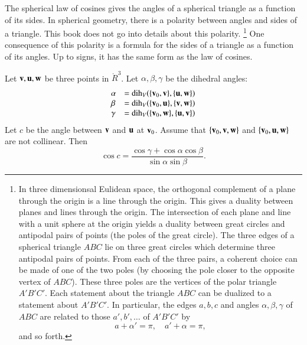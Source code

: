 The spherical law of cosines gives the angles of a spherical triangle
as a function of its sides.  In spherical geometry, there is a
polarity between angles and sides of a triangle.  This book does not
go into details about this polarity.%
\footnote{In three dimensionsal Eulidean space, the orthogonal
  complement of a plane through the origin is a line through the
  origin.  This gives a duality between planes and lines through the
  origin.  The intersection of each plane and line with a unit sphere
  at the origin yields a duality between great circles and antipodal
  pairs of points (the poles of the great circle).  The three edges of
  a spherical triangle $ABC$ lie on three great circles which
  determine three antipodal pairs of points.  From each of the three
  pairs, a coherent choice can be made of one of the two poles (by
  choosing the pole closer to the opposite vertex of $ABC$).  These
  three poles are the vertices of the polar triangle $A'B'C'$.  Each
  statement about the triangle $ABC$ can be dualized to a statement
  about $A'B'C'$.  In particular, the edges $a,b,c$ and angles
  $\alpha,\beta,\gamma$ of $ABC$ are related to those $a',b',\ldots$
  of $A'B'C'$ by
\begin{displaymath}
a + \alpha' = \pi,\quad a' + \alpha= \pi,
\end{displaymath}
and so forth.
}  %
One
consequence of this polarity is a formula for the sides of
a triangle as a function of its angles.  Up to signs,
it has the same form as the law of cosines.
%

\begin{lemma}
\label{lemma:sloc2}  Let
  ${\mathbf v},{\mathbf u},{\mathbf w}$ be three points in $\ring{R}^3$.  Let
  $\alpha,\beta,\gamma$ be the dihedral angles:
\begin{displaymath}
\begin{array}{lll}
\alpha &= \operatorname{dih}_V(\{{\mathbf v}_0,{\mathbf v}\},\{{\mathbf u},{\mathbf w}\})\\
\beta &= \operatorname{dih}_V(\{{\mathbf v}_0,{\mathbf u}\},\{{\mathbf v},{\mathbf w}\})\\
\gamma&= \operatorname{dih}_V(\{{\mathbf v}_0,{\mathbf w}\},\{{\mathbf u},{\mathbf v}\})\\
\end{array}
\end{displaymath}
Let $c$ be the
angle between ${\mathbf v}$ and ${\mathbf u}$ at ${\mathbf v}_0$. 
Assume that $\{{\mathbf v}_0,{\mathbf v},{\mathbf w}\}$ and $\{{\mathbf v}_0,{\mathbf u},{\mathbf w}\}$ are not collinear.
Then
\begin{displaymath}
\cos c = \frac{\cos \gamma + \cos \alpha \cos \beta}
{\sin \alpha\sin \beta}.
\end{displaymath}
\end{lemma}
%
%

